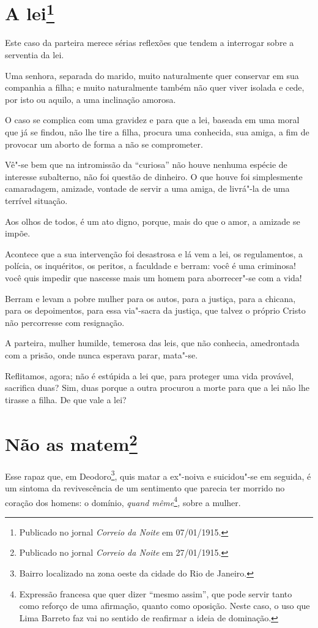 \chapter[A lei]{A lei\footnote[*]{Publicado no jornal \emph{Correio da Noite} em 07/01/1915.}}

Este caso da parteira merece sérias reflexões que tendem a interrogar
sobre a serventia da lei.

Uma senhora, separada do marido, muito naturalmente quer conservar em
sua companhia a filha; e muito naturalmente também não quer viver
isolada e cede, por isto ou aquilo, a uma inclinação amorosa.

O caso se complica com uma gravidez e para que a lei, baseada em uma
moral que já se findou, não lhe tire a filha, procura uma conhecida, sua
amiga, a fim de provocar um aborto de forma a não se comprometer.

Vê"-se bem que na intromissão da ``curiosa'' não houve nenhuma espécie de
interesse subalterno, não foi questão de dinheiro. O que houve foi
simplesmente camaradagem, amizade, vontade de servir a uma amiga, de
livrá"-la de uma terrível situação.

Aos olhos de todos, é um ato digno, porque, mais do que o amor, a
amizade se impõe.

Acontece que a sua intervenção foi desastrosa e lá vem a lei, os
regulamentos, a polícia, os inquéritos, os peritos, a faculdade e
berram: você é uma criminosa! você quis impedir que nascesse mais um
homem para aborrecer"-se com a vida!

Berram e levam a pobre mulher para os autos, para a justiça, para a
chicana, para os depoimentos, para essa via"-sacra da justiça, que talvez
o próprio Cristo não percorresse com resignação.

A parteira, mulher humilde, temerosa das leis, que não conhecia,
amedrontada com a prisão, onde nunca esperava parar, mata"-se.

Reflitamos, agora; não é estúpida a lei que, para proteger uma vida
provável, sacrifica duas? Sim, duas porque a outra procurou a morte para
que a lei não lhe tirasse a filha. De que vale a lei?

\chapter[Não as matem]{Não as matem\footnote[*]{Publicado no jornal \emph{Correio da Noite} em 27/01/1915.}}

Esse rapaz que, em Deodoro\footnote{Bairro localizado na zona oeste da
  cidade do Rio de Janeiro.}, quis matar a ex"-noiva e suicidou"-se em
seguida, é um sintoma da revivescência de um sentimento que parecia ter
morrido no coração dos homens: o domínio, \emph{quand même}\footnote{Expressão
  francesa que quer dizer ``mesmo assim'', que pode servir tanto como
  reforço de uma afirmação, quanto como oposição. Neste caso, o uso que
  Lima Barreto faz vai no sentido de reafirmar a ideia de dominação.}\emph{,}
sobre a mulher.

